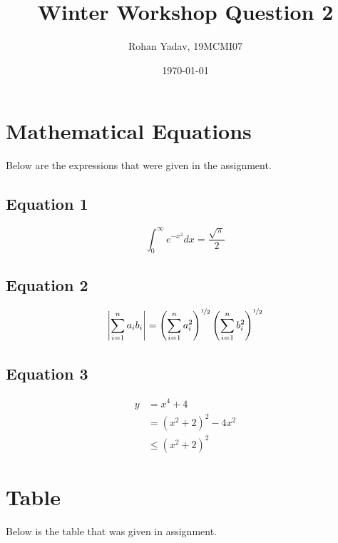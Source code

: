 \documentclass{article}
\title{Winter Workshop Question 2}
\author{Rohan Yadav, 19MCMI07}
\date{\today}
\begin{document}
    \maketitle

    \section{Mathematical Equations}
        Below are the expressions that were given in the assignment.
        \subsection{Equation 1}
            $$ \int_{0}^{\infty} e^{-x^2} dx = \frac{\sqrt{\pi}}{2} $$
        
        \subsection{Equation 2}
            $$ \left| \sum_{i=1}^{n} a_i b_i \right| = \left( \sum_{i=1}^{n} a_{i}^{2} \right)^{\nicefrac{1}{2}} \left( \sum_{i=1}^{n} b_{i}^{2} \right)^{\nicefrac{1}{2}} $$
            
        \subsection{Equation 3}
            \begin{equation}
            \begin{split}
            y & = x^4 + 4 \\
            & = (x^2 + 2)^2 - 4x^2 \\
            & \leq (x^2 + 2)^2
            \end{split}
        \end{equation}
    \section{Table}
        Below is the table that was given in assignment.
\end{document}
